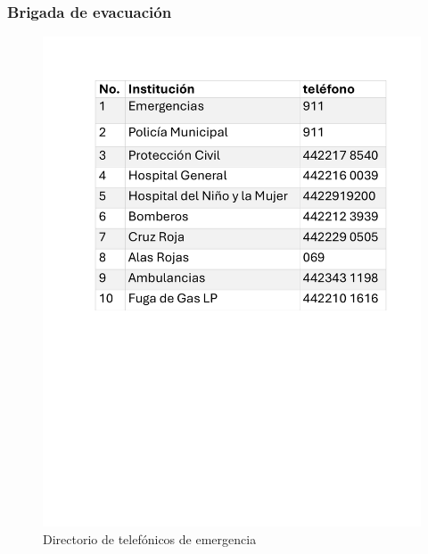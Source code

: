 \subsubsection{Brigada de evacuación}
\begin{figure}[H]
    \centering
    \includegraphics[scale=0.4]{13/img/directrorio.pdf}
    \caption{Directorio de telefónicos de emergencia}
\end{figure}

% 
% 
% 
% 
